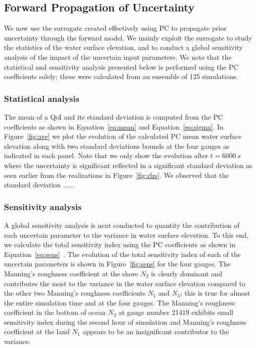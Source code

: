 \subsection{Forward Propagation of Uncertainty}
\label{sec:forward}
We now use the surrogate created effectively using PC to propagate prior 
uncertainty through the forward model. We mainly exploit the surrogate 
to study the statistics of the water surface elevation, and to conduct 
a global sensitivity analysis of the impact of the uncertain input parameters.
We note that the statistical and sensitivity analysis presented below 
is performed using the PC coefficients solely; these were calculated
from an ensemble of 125 \geoclaw simulations.
\subsubsection{Statistical analysis}
The mean of a QoI and its standard deviation is computed
from the PC coefficients as shown in Equation~\ref{eq:mean} and Equation~\ref{eq:sigma}. 
In Figure~\ref{fig:ave} we plot the evolution of
the calculated PC mean water surface elevation along with two standard deviations
bounds at the four gauges as indicated in each panel.  
Note that we only show the evolution after $t=6000~s$ where the uncertainty is significant
reflected in a significant standard deviation as seen earlier from the realizations in Figure~\ref{fig:rlzs}.
We observed that the standard deviation ...... 


         
        
\subsubsection{Sensitivity analysis}
A global sensitivity analysis is next conducted to quantity the contribution of each
uncertain parameter to the variance in water surface elevation. To this end, we calculate 
the total sensitivity index using the PC coefficients as shown in Equation~\ref{eq:sens}~\citep{Alexanderian2012,Sudret,Crestaux}. The evolution of the total sensitivity index
of each of the uncertain parameters is shown in Figure~\ref{fig:sens} for the four gauges. 
The Manning's roughness coefficient at the shore $N_2$ is clearly dominant and contributes
the most to the variance in the water surface elevation compared to the other two 
Manning's roughness coefficients $N_1$ and $N_3$; this is true for almost the entire simulation time
and at the four gauges. The Manning's roughness coefficient
in the bottom of ocean $N_{3}$ at gauge number 21419 exhibits small sensitivity index 
during the second hour of simulation and Manning's roughness coefficient
at the land $N_1$ appears to be an insignificant contributor
to the variance.

